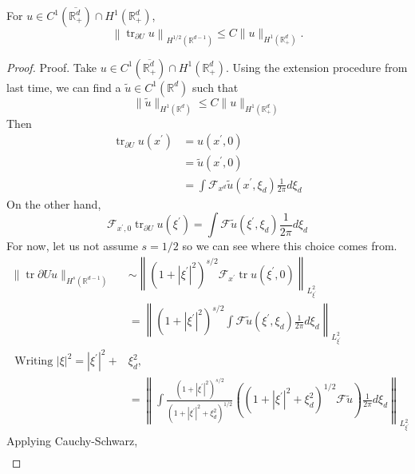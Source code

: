 \begin{theorem}
For $u \in C^{1}\left(\overline{\mathbb{R}_{+}^{d}}\right) \cap H^{1}\left(\mathbb{R}_{+}^{d}\right)$,
$$
\left\|\operatorname{tr}_{\partial U} u\right\|_{H^{1 / 2}\left(\mathbb{R}^{d-1}\right)} \leq C\|u\|_{H^{1}\left(\mathbb{R}_{+}^{d}\right)} .
$$
\end{theorem}
\begin{proof}
    Proof. Take $u \in C^{1}\left(\overline{\mathbb{R}_{+}^{d}}\right) \cap H^{1}\left(\mathbb{R}_{+}^{d}\right)$. Using the extension procedure from last time, we can find a $\tilde{u} \in C^{1}\left(\mathbb{R}^{d}\right)$ such that
$$
\|\tilde{u}\|_{H^{1}\left(\mathbb{R}^{d}\right)} \leq C\|u\|_{H^{1}\left(\mathbb{R}_{+}^{d}\right)}
$$
Then
$$
\begin{aligned}
\operatorname{tr}_{\partial U} u\left(x^{\prime}\right) &=u\left(x^{\prime}, 0\right) \\
&=\widetilde{u}\left(x^{\prime}, 0\right) \\
&=\int \mathcal{F}_{x^{d}} \widetilde{u}\left(x^{\prime}, \xi_{d}\right) \frac{1}{2 \pi} d \xi_{d}
\end{aligned}
$$
On the other hand,
$$
\mathcal{F}_{x^{\prime},0} \operatorname{tr}_{\partial U} u\left(\xi^{\prime}\right)=\int \mathcal{F} \widetilde{u}\left(\xi^{\prime}, \xi_{d}\right) \frac{1}{2 \pi} d \xi_{d}
$$
For now, let us not assume $s=1 / 2$ so we can see where this choice comes from.
$$
\begin{aligned}
\|\operatorname{tr} \partial U u\|_{H^{s}\left(\mathbb{R}^{d-1}\right)} & \sim\left\|\left(1+\left|\xi^{\prime}\right|^{2}\right)^{s / 2} \mathcal{F}_{x^{\prime}} \operatorname{tr} u\left(\xi^{\prime},0\right)\right\|_{L_{\xi^{\prime}}^{2}} \\
&=\left\|\left(1+\left|\xi^{\prime}\right|^{2}\right)^{s / 2} \int \mathcal{F} \widetilde{u}\left(\xi^{\prime}, \xi_{d}\right) \frac{1}{2 \pi} d \xi_{d}\right\|_{L_{\xi^{\prime}}^{2}} \\
\text { Writing }|\xi|^{2}=\left|\xi^{\prime}\right|^{2}+& \xi_{d}^{2}, \\
&=\left\|\int \frac{\left(1+\left|\xi^{\prime}\right|^{2}\right)^{s / 2}}{\left(1+\left|\xi^{\prime}\right|^{2}+\xi_{d}^{2}\right)^{1 / 2}}\left(\left(1+\left|\xi^{\prime}\right|^{2}+\xi_{d}^{2}\right)^{1 / 2} \mathcal{F} \widetilde{u}\right) \frac{1}{2 \pi} d \xi_{d}\right\|_{L_{\xi^{\prime}}^{2}}
\end{aligned}
$$
Applying Cauchy-Schwarz,
$$
\begin{aligned}

\end{aligned}$$
\end{proof}
